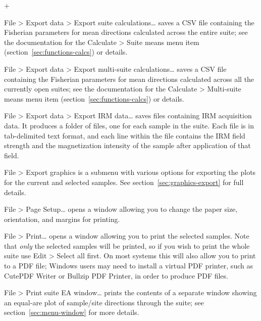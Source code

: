 \documentclass[a4paper,british]{article}
\newcommand{\menuitemlabel}[1]{%
\mbox{\textsf{#1}}\hfil}
\newenvironment{menuitemlist}%
{\begin{list}{}{%
\renewcommand{\makelabel}{\menuitemlabel}%
\setlength{\labelwidth}{35pt}%
\setlength{\leftmargin}%
             {\labelwidth+\labelsep}}}%
{\end{list}}
\newcommand{\ppcmd}[1]{\textsf{#1}} %
\newcommand{\caps}[1]{\MakeTextUppercase{#1}} %
\newcommand{\submenu}{ \textgreater{} } %
\begin{document}
\begin{menuitemlist}
\begin{table}[tp]
\end{table}

\item[File\submenu Export data\submenu Export suite calculations\ldots] saves
  a \caps{csv} file containing the Fisherian parameters for mean directions
  calculated across the entire suite; see the documentation for the
  \ppcmd{Calculate\submenu Suite means} menu item
  (section~\ref{sec:functions-calcs}) or details.

\item[File\submenu Export data\submenu Export multi-suite calculations\ldots]
  saves a \caps{csv} file containing the Fisherian parameters for mean
  directions calculated across all the currently open suites; see the
  documentation for the \ppcmd{Calculate\submenu Multi-suite means} menu item
  (section~\ref{sec:functions-calcs}) or details.

\item[File\submenu Export data\submenu Export IRM data\ldots] saves files
  containing \caps{irm} acquisition data. It produces a folder of files, one
  for each sample in the suite. Each file is in tab-delimited text format,
  and each line within the file contains the \caps{irm} field strength and
  the magnetization intensity of the sample after application of that field.

\item[File\submenu Export graphics] is a submenu with various options
  for exporting the plots for the current and selected samples.
  See section~\ref{sec:graphics-export} for full details.

\item[File\submenu Page Setup\ldots] opens a window allowing you
to change the paper size, orientation, and margins for printing.

\item[File\submenu Print\ldots] opens a window allowing you to print the
  selected samples. Note that {\em only} the selected samples will be
  printed, so if you wish to print the whole suite use \ppcmd{Edit\submenu
    Select all} first. On most systems this will also allow you to print to a
  \caps{pdf} file; Windows users may need to install a virtual \caps{pdf}
  printer, such as Cute\caps{pdf} Writer or Bullzip \caps{pdf} Printer, in
  order to produce \caps{pdf} files.

\item[File\submenu Print suite EA window\ldots] prints the contents of a
  separate window showing an equal-are plot of sample/site directions through
  the suite; see section~\ref{sec:menu-window} for more details.


\end{menuitemlist}
\end{document}
